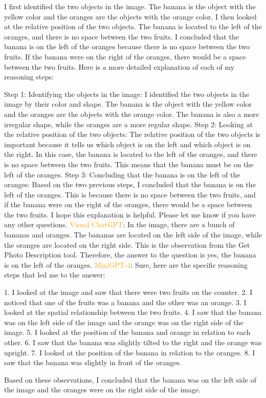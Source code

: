 \begin{enumerate}
        I first identified the two objects in the image. The banana is the object with the yellow color and the oranges are the objects with the orange color.
        I then looked at the relative position of the two objects. The banana is located to the left of the oranges, and there is no space between the two fruits.
        I concluded that the banana is on the left of the oranges because there is no space between the two fruits. If the banana were on the right of the oranges, there would be a space between the two fruits.
        Here is a more detailed explanation of each of my reasoning steps:
        
        Step 1: Identifying the objects in the image: I identified the two objects in the image by their color and shape. The banana is the object with the yellow color and the oranges are the objects with the orange color. The banana is also a more irregular shape, while the oranges are a more regular shape.
        Step 2: Looking at the relative position of the two objects: The relative position of the two objects is important because it tells us which object is on the left and which object is on the right. In this case, the banana is located to the left of the oranges, and there is no space between the two fruits. This means that the banana must be on the left of the oranges.
        Step 3: Concluding that the banana is on the left of the oranges: Based on the two previous steps, I concluded that the banana is on the left of the oranges. This is because there is no space between the two fruits, and if the banana were on the right of the oranges, there would be a space between the two fruits.
        I hope this explanation is helpful. Please let me know if you have any other questions.
        \subitem \textcolor{orange}{Visual ChatGPT}: In the image, there are a bunch of bananas and oranges. The bananas are located on the left side of the image, while the oranges are located on the right side. This is the observation from the Get Photo Description tool. Therefore, the answer to the question is yes, the banana is on the left of the oranges.
        \subitem \textcolor{orange}{MiniGPT-4}: Sure, here are the specific reasoning steps that led me to the answer:

        1. I looked at the image and saw that there were two fruits on the counter.
        2. I noticed that one of the fruits was a banana and the other was an orange.
        3. I looked at the spatial relationship between the two fruits.
        4. I saw that the banana was on the left side of the image and the orange was on the right side of the image.
        5. I looked at the position of the banana and orange in relation to each other.
        6. I saw that the banana was slightly tilted to the right and the orange was upright.
        7. I looked at the position of the banana in relation to the oranges.
        8. I saw that the banana was slightly in front of the oranges.
        
        Based on these observations, I concluded that the banana was on the left side of the image and the oranges were on the right side of the image.
    \end{enumerate}
